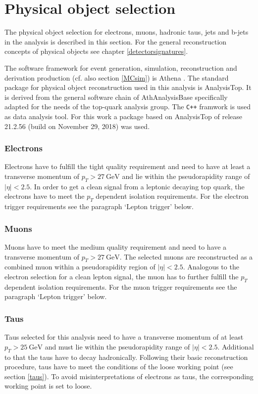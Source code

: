\section{Physical object selection}\label{physObj}
The physical object selection for electrons, muons, hadronic taus, jets and b-jets in the analysis is described in this section. For the general reconstruction concepts of physical objects see chapter \ref{detectorsignatures}.\par
The {\ATLAS} software framework for event generation, simulation, reconstruction and derivation production (cf. also section \ref{MCsim}) is Athena \cite{Athena}. %
The standard package for physical object reconstruction used in this analysis is AnalysisTop. It is derived from the general software chain of AthAnalysisBase specifically adapted for the needs of the top-quark analysis group. The \texttt{C++} framwork {\ROOT} is used as data analysis tool. For this work a package based on AnalysisTop of release 21.2.56 (build on November 29, 2018) was used.\par
\subsubsection*{Electrons}
Electrons have to fulfill the tight quality requirement and need to have at least a transverse momentum of $p_T>\SI{27}{\giga\electronvolt}$ and lie within the pseudorapidity range of $|\eta|<2.5$. In order to get a clean signal from a leptonic decaying top quark, the electrons have to meet the $p_T$ dependent isolation requirements. For the electron trigger requirements see the paragraph `Lepton trigger' below.
\subsubsection*{Muons}
Muons have to meet the medium quality requirement and need to have a transverse momentum of $p_T>\SI{27}{\giga\electronvolt}$. The selected muons are reconstructed as a combined muon within a pseudorapidity region of $|\eta|<2.5$. Analogous to the electron selection for a clean lepton signal, the muon has to further fulfill the $p_T$ dependent isolation requirements. For the muon trigger requirements see the paragraph `Lepton trigger' below. 
\subsubsection*{Taus}
Taus selected for this analysis need to have a transverse momentum of at least $p_T>\SI{25}{\giga\electronvolt}$ and must lie within the pseudorapidity range of $|\eta|<2.5$. Additional to that the taus have to decay hadronically. Following their basic reconstruction procedure, taus have to meet the conditions of the loose working point (see section \ref{taus}). To avoid misinterpretations of electrons as taus, the corresponding working point is set to loose.
